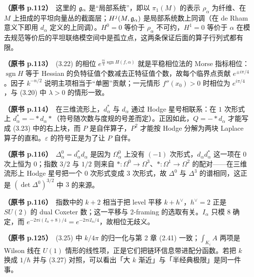 \noindent \textbf{（原书 p.112）}\ 这里的 $\mathfrak{g}_{\alpha}$ 是“局部系统”，即以 $\pi_{1}(M)$ 的表示 $\rho_{\alpha}$ 为纤维、在 $M$ 上扭成的平坦向量丛的截面层；$H^{j}(M,\mathfrak{g}_{\alpha})$ 是局部系统数上同调（在 de Rham 意义下即用 $d_{\alpha}$ 定义的上同调）。$H^{0}=0$ 等价于 $\rho_{\alpha}$ 不可约，$H^{1}=0$ 等价于 $\alpha$ 在模去规范等价后的平坦联络模空间中是孤立点，这两条保证后面的算子行列式都有限。\par\smallskip

\noindent \textbf{（原书 p.113）}\ (3.22) 的相位 $e^{\frac{\pi i}{4}\operatorname{sgn} H(f,\alpha)}$ 就是平稳相位法的 Morse 指标相位：$\operatorname{sgn} H$ 等于 Hessian 的负特征值个数减去正特征值个数，故每个临界点贡献 $e^{\pm i\pi/4}$。因子 $k^{-n/2}$ 说明主项相当于“单圈”贡献；一元情形 $f''(x_{0})>0$ 时相位为 $e^{i\pi/4}$，与 (3.20) 中 $\lambda>0$ 的情形一致。\par\smallskip

\noindent \textbf{（原书 p.114）}\ 在三维流形上，$d^{*}_{\alpha}$ 与 $d_{\alpha}$ 通过 Hodge 星号相联系：在 $1$ 次形式上 $d^{*}_{\alpha}=-\ast d_{\alpha}\ast$（符号随次数与度规的号差而定）。正因如此，$Q=-*d_{\alpha}$ 才能写成 (3.23) 中的右上块，而 $P$ 是自伴算子，$P^{2}$ 才能按 Hodge 分解为两块 Laplace 算子的直和。$\varepsilon$ 的符号正是为了让 $P$ 自伴。\par\smallskip

\noindent \textbf{（原书 p.116）}\ $\Delta^{0}_{\alpha}=d^{*}_{\alpha}d_{\alpha}$ 是因为 $\Omega^{0}_{\alpha}$ 上没有 $(-1)$ 次形式，$d_{\alpha}d^{*}_{\alpha}$ 这一项在 $0$ 次上恒为 $0$；指数 $3/2$ 与 $1/2$ 则来自 $\ast:\Omega^{0}\to\Omega^{3}$、$\ast:\Omega^{1}\to\Omega^{2}$ 的配对------在三维流形上 Hodge 星号把一个 $0$ 次形式变成 $3$ 次形式，故 $\Delta^{0}$ 与 $\Delta^{3}$ 的谱相同，这正是 $(\det\Delta^{0})^{3/2}$ 中 $3$ 的来源。\par\smallskip

\noindent \textbf{（原书 p.116）}\ 指数中的 $k+2$ 相当于把 level 平移 $k+h^{\vee}$，$h^{\vee}=2$ 正是 $SU(2)$ 的 dual Coxeter 数；这一平移与 2-framing 的选取有关。$I_{\alpha}$ 只模 $8$ 确定，而 $e^{-2\pi i(I_{\alpha}+8)/4}=e^{-2\pi iI_{\alpha}/4}$，故相位无歧义。\par\smallskip

\noindent \textbf{（原书 p.125）}\ (3.25) 中 $k/4\pi$ 的归一化与第 2 章 (2.41) 一致；$\int_{K_i}A$ 两项是 Wilson 线在 $U(1)$ 情形的线性项，正是它们把链环信息带进配分函数。若把 $k$ 换成 $1/\hbar$ 并与 (3.27) 对照，可以看出「大 $k$ 渐近」与「半经典极限」是同一件事。\par\smallskip

